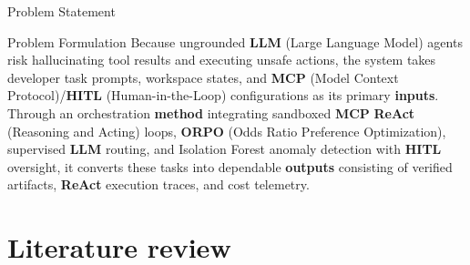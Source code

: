 \begin{frame}{Problem Statement}
\vspace{0.25cm}
\begin{block}{Problem Formulation}
\normalsize
Because ungrounded \textbf{LLM} (Large Language Model) agents risk hallucinating tool results and executing unsafe actions, the system takes developer task prompts, workspace states, and \textbf{MCP} (Model Context Protocol)/\textbf{HITL} (Human-in-the-Loop) configurations as its primary \textbf{inputs}. Through an orchestration \textbf{method} integrating sandboxed \textbf{MCP} \textbf{ReAct} (Reasoning and Acting) loops, \textbf{ORPO} (Odds Ratio Preference Optimization), supervised \textbf{LLM} routing, and Isolation Forest anomaly detection with \textbf{HITL} oversight, it converts these tasks into dependable \textbf{outputs} consisting of verified artifacts, \textbf{ReAct} execution traces, and cost telemetry.
\end{block}
\end{frame}

\section{Literature review}

